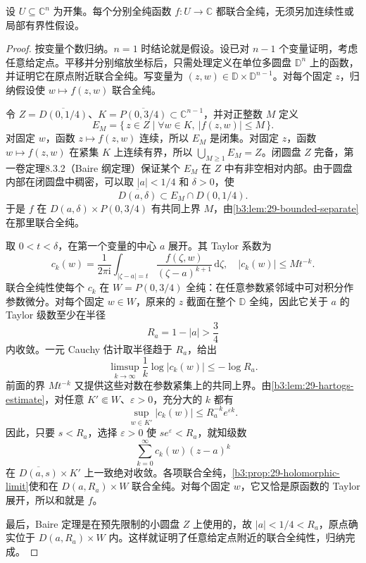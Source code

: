 \begin{theorem}\label{b3:thm:29-hartogs-separate}
设 \(U\subseteq\mathbb C^n\) 为开集。每个分别全纯函数 \(f:U\to\mathbb C\) 都联合全纯，无须另加连续性或局部有界性假设。
\end{theorem}
\begin{proof}
按变量个数归纳。\(n=1\) 时结论就是假设。设已对 \(n-1\) 个变量证明，考虑任意给定点。平移并分别缩放坐标后，只需处理定义在单位多圆盘 \(\mathbb D^n\) 上的函数，并证明它在原点附近联合全纯。写变量为 \((z,w)\in\mathbb D\times\mathbb D^{n-1}\)。对每个固定 \(z\)，归纳假设使 \(w\mapsto f(z,w)\) 联合全纯。

令 \(Z=\overline{D(0,1/4)}\)、\(K=\overline{P(0,3/4)}\subset\mathbb C^{n-1}\)，并对正整数 \(M\) 定义
\[
 E_M=\{\,z\in Z\mid \forall w\in K,\ |f(z,w)|\le M\,\}.
\]
对固定 \(w\)，函数 \(z\mapsto f(z,w)\) 连续，所以 \(E_M\) 是闭集。对固定 \(z\)，函数 \(w\mapsto f(z,w)\) 在紧集 \(K\) 上连续有界，所以 \(\bigcup_{M\ge1}E_M=Z\)。闭圆盘 \(Z\) 完备，第一卷定理8.3.2（Baire 纲定理）保证某个 \(E_M\) 在 \(Z\) 中有非空相对内部。由于圆盘内部在闭圆盘中稠密，可以取 \(|a|<1/4\) 和 \(\delta>0\)，使
\[
 \overline{D(a,\delta)}\subset E_M\cap D(0,1/4).
\]
于是 \(f\) 在 \(D(a,\delta)\times P(0,3/4)\) 有共同上界 \(M\)，由\cref{b3:lem:29-bounded-separate}在那里联合全纯。

取 \(0<t<\delta\)，在第一个变量的中心 \(a\) 展开。其 Taylor 系数为
\[
 c_k(w)=\frac1{2\pi\mathrm{i}}
 \int_{|\zeta-a|=t}\frac{f(\zeta,w)}{(\zeta-a)^{k+1}}\,\mathrm{d}\zeta,
 \quad |c_k(w)|\le Mt^{-k}.
\]
联合全纯性使每个 \(c_k\) 在 \(W=P(0,3/4)\) 全纯：在任意参数紧邻域中可对积分作参数微分。对每个固定 \(w\in W\)，原来的 \(z\) 截面在整个 \(\mathbb D\) 全纯，因此它关于 \(a\) 的 Taylor 级数至少在半径
\[
 R_a=1-|a|>\frac34
\]
内收敛。一元 Cauchy 估计取半径趋于 \(R_a\)，给出
\[
 \limsup_{k\to\infty}\frac1k\log|c_k(w)|\le-\log R_a.
\]
前面的界 \(Mt^{-k}\) 又提供这些对数在参数紧集上的共同上界。由\cref{b3:lem:29-hartogs-estimate}，对任意 \(K'\Subset W\)、\(\varepsilon>0\)，充分大的 \(k\) 都有
\[
 \sup_{w\in K'}|c_k(w)|\le R_a^{-k}e^{\varepsilon k}.
\]
因此，只要 \(s<R_a\)，选择 \(\varepsilon>0\) 使 \(se^\varepsilon<R_a\)，就知级数
\[
 \sum_{k=0}^\infty c_k(w)(z-a)^k
\]
在 \(\overline{D(a,s)}\times K'\) 上一致绝对收敛。各项联合全纯，\cref{b3:prop:29-holomorphic-limit}使和在 \(D(a,R_a)\times W\) 联合全纯。对每个固定 \(w\)，它又恰是原函数的 Taylor 展开，所以和就是 \(f\)。

最后，Baire 定理是在预先限制的小圆盘 \(Z\) 上使用的，故 \(|a|<1/4<R_a\)，原点确实位于 \(D(a,R_a)\times W\) 内。这样就证明了任意给定点附近的联合全纯性，归纳完成。
\end{proof}

